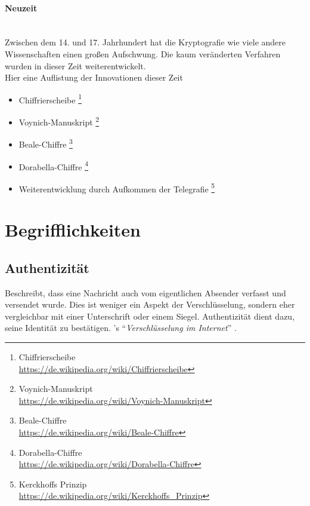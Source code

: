 \paragraph{Neuzeit}
\hfill\\
Zwischen dem 14. und 17. Jahrhundert hat die Kryptografie wie viele andere Wissenschaften einen großen Aufschwung.
Die kaum veränderten Verfahren wurden in dieser Zeit weiterentwickelt.
\\Hier eine Auflistung der Innovationen dieser Zeit
\begin{itemize}
    \item Chiffrierscheibe \footnote{Chiffrierscheibe\\\url{https://de.wikipedia.org/wiki/Chiffrierscheibe}}
    \item Voynich-Manuskript \footnote{Voynich-Manuskript\\\url{https://de.wikipedia.org/wiki/Voynich-Manuskript}}
    \item Beale-Chiffre \footnote{Beale-Chiffre\\\url{https://de.wikipedia.org/wiki/Beale-Chiffre}}
    \item Dorabella-Chiffre \footnote{Dorabella-Chiffre \\\url{https://de.wikipedia.org/wiki/Dorabella-Chiffre}}
    \item Weiterentwicklung durch Aufkommen der Telegrafie \footnote{Kerckhoffs Prinzip \\\url{https://de.wikipedia.org/wiki/Kerckhoffs_Prinzip}}
\end{itemize}


\section{Begrifflichkeiten}

\subsection{Authentizität}
Beschreibt, dass eine Nachricht auch vom eigentlichen Absender verfasst und versendet wurde.
Dies ist weniger ein Aspekt der Verschlüsselung, sondern eher vergleichbar mit einer Unterschrift oder einem Siegel.
Authentizität dient dazu, seine Identität zu bestätigen.
\citeauthor{richter}'s ``\emph{Verschlüsselung im Internet}'' \citep{richter}.

